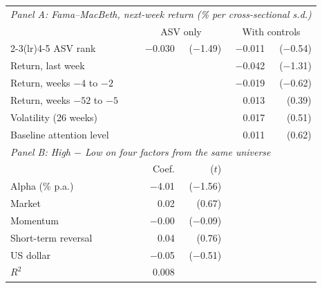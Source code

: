 \begin{tabular}{lrrrr}
\toprule
\multicolumn{5}{l}{\textit{Panel A: Fama--MacBeth, next-week return (\% per cross-sectional s.d.)}} \\
 & \multicolumn{2}{c}{ASV only} & \multicolumn{2}{c}{With controls} \\
\cmidrule(lr){2-3}\cmidrule(lr){4-5}
ASV rank & $-$0.030 & ($-$1.49) & $-$0.011 & ($-$0.54) \\
Return, last week &  &  & $-$0.042 & ($-$1.31) \\
Return, weeks $-4$ to $-2$ &  &  & $-$0.019 & ($-$0.62) \\
Return, weeks $-52$ to $-5$ &  &  & 0.013 & (0.39) \\
Volatility (26 weeks) &  &  & 0.017 & (0.51) \\
Baseline attention level &  &  & 0.011 & (0.62) \\
\midrule
\multicolumn{5}{l}{\textit{Panel B: High $-$ Low on four factors from the same universe}} \\
 & Coef. & ($t$) & & \\
Alpha (\% p.a.) & $-$4.01 & ($-$1.56) & & \\
Market & 0.02 & (0.67) & & \\
Momentum & $-$0.00 & ($-$0.09) & & \\
Short-term reversal & 0.04 & (0.76) & & \\
US dollar & $-$0.05 & ($-$0.51) & & \\
$R^2$ & 0.008 & & & \\
\bottomrule
\end{tabular}